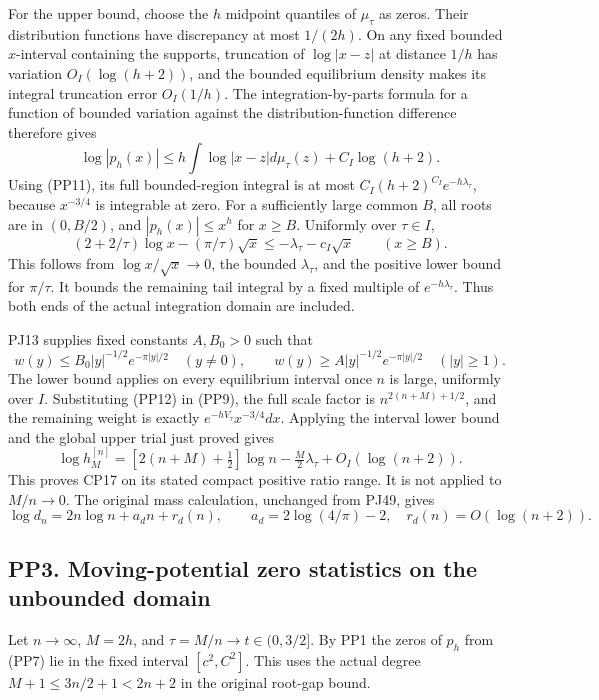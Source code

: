 \documentclass[10pt]{article}
\begin{document}
For the upper bound, choose the \(h\) midpoint quantiles of \(\mu_\tau\) as zeros. Their distribution functions have discrepancy at most \(1/(2h)\). On any fixed bounded \(x\)-interval containing the supports, truncation of \(\log|x-z|\) at distance \(1/h\) has variation \(O_I(\log(h+2))\), and the bounded equilibrium density makes its integral truncation error \(O_I(1/h)\). The integration-by-parts formula for a function of bounded variation against the distribution-function difference therefore gives \[
\log|p_h(x)|\le h\int\log|x-z|d\mu_\tau(z)+C_I\log(h+2).
\] Using (PP11), its full bounded-region integral is at most \(C_I(h+2)^{C_I}e^{-h\lambda_\tau}\), because \(x^{-3/4}\) is integrable at zero. For a sufficiently large common \(B\), all roots are in \((0,B/2)\), and \(|p_h(x)|\le x^h\) for \(x\ge B\). Uniformly over \(\tau\in I\), \[
(2+2/\tau)\log x-(\pi/\tau)\sqrt x
\le-\lambda_\tau-c_I\sqrt x\qquad(x\ge B).
\] This follows from \(\log x/\sqrt x\to0\), the bounded \(\lambda_\tau\), and the positive lower bound for \(\pi/\tau\). It bounds the remaining tail integral by a fixed multiple of \(e^{-h\lambda_\tau}\). Thus both ends of the actual integration domain are included.

PJ13 supplies fixed constants \(A,B_0>0\) such that \[
w(y)\le B_0|y|^{-1/2}e^{-\pi|y|/2}\quad(y\ne0),
\qquad
w(y)\ge A|y|^{-1/2}e^{-\pi|y|/2}\quad(|y|\ge1).
\tag{PP12}
\] The lower bound applies on every equilibrium interval once \(n\) is large, uniformly over \(I\). Substituting (PP12) in (PP9), the full scale factor is \(n^{2(n+M)+1/2}\), and the remaining weight is exactly \(e^{-hV_\tau}x^{-3/4}dx\). Applying the interval lower bound and the global upper trial just proved gives \[
\boxed{\log h_M^{[n]}=[2(n+M)+\tfrac12]\log n
-\tfrac M2\lambda_\tau+O_I(\log(n+2)).}
\tag{PP13}
\] This proves CP17 on its stated compact positive ratio range. It is not applied to \(M/n\to0\). The original mass calculation, unchanged from PJ49, gives \[
\log d_n=2n\log n+a_dn+r_d(n),\qquad
a_d=2\log(4/\pi)-2,
\quad r_d(n)=O(\log(n+2)).
\tag{PP14}
\]

\subsection{PP3. Moving-potential zero statistics on the unbounded domain}\label{pp3.-moving-potential-zero-statistics-on-the-unbounded-domain}

Let \(n\to\infty\), \(M=2h\), and \(\tau=M/n\to t\in(0,3/2]\). By PP1 the zeros of \(p_h\) from (PP7) lie in the fixed interval \([c^2,C^2]\). This uses the actual degree \(M+1\le3n/2+1<2n+2\) in the original root-gap bound.
\end{document}
